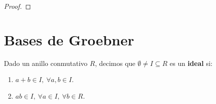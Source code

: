 \begin{proof}

\end{proof}
\section{Bases de Groebner}

\begin{definicion}
  Dado un anillo conmutativo $R$, decimos que $\emptyset \neq I \subseteq R$ es un \textbf{ideal} si:
  \begin{enumerate}
    \item $a+b\in I,\ \forall a,b\in I$.
    \item $ab\in I,\ \forall a\in I,\ \forall b\in R$.
  \end{enumerate}
\end{definicion}